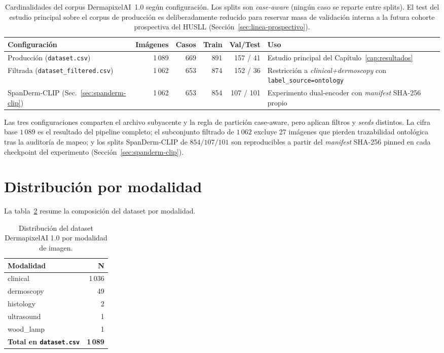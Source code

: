 \begin{table}[H]
\centering
\small
\caption{Cardinalidades del corpus DermapixelAI~1.0 según
configuración. Los splits son \emph{case-aware} (ningún caso se
reparte entre splits). El test del estudio principal sobre el
corpus de producción es deliberadamente reducido para reservar
masa de validación interna a la futura cohorte prospectiva del
HUSLL (Sección~\ref{sec:linea-prospectivo}).}
\label{tab:anexo-cardinalidades}
\begin{tabular}{lrrrrl}
\hline
Configuración & Imágenes & Casos & Train & Val/Test & Uso \\
\hline
Producción (\texttt{dataset.csv})           & 1\,089 & 669 & 891 & 157 / 41 & Estudio principal del Capítulo~\ref{cap:resultados} \\
Filtrada (\texttt{dataset\_filtered.csv})   & 1\,062 & 653 & 874 & 152 / 36 & Restricción a \emph{clinical+dermoscopy} con \texttt{label\_source=ontology} \\
SpanDerm-CLIP (Sec.~\ref{sec:spanderm-clip}) & 1\,062 & 653 & 854 & 107 / 101 & Experimento dual-encoder con \emph{manifest} SHA-256 propio \\
\hline
\end{tabular}
\end{table}

Las tres configuraciones comparten el archivo subyacente y la
regla de partición case-aware, pero aplican filtros y \emph{seeds}
distintos. La cifra base $1\,089$ es el resultado del pipeline
completo; el subconjunto filtrado de $1\,062$ excluye 27 imágenes
que pierden trazabilidad ontológica tras la auditoría de mapeo; y
los splits SpanDerm-CLIP de $854/107/101$ son reproducibles a
partir del \emph{manifest} SHA-256 pinned en cada checkpoint del
experimento (Sección~\ref{sec:spanderm-clip}).

\section{Distribución por modalidad}
\label{sec:anexo-modalidad}

La tabla~\ref{tab:anexo-modalidad} resume la composición del dataset
por modalidad.

\begin{table}[H]
\centering
\small
\caption{Distribución del dataset DermapixelAI 1.0 por modalidad de
imagen.}
\label{tab:anexo-modalidad}
\begin{tabular}{lr}
\hline
Modalidad        & N       \\
\hline
clinical         & 1\,036  \\
dermoscopy       & 49      \\
histology        & 2       \\
ultrasound       & 1       \\
wood\_lamp       & 1       \\
\hline
\textbf{Total en \texttt{dataset.csv}} & \textbf{1\,089} \\
\hline
\end{tabular}
\end{table}

